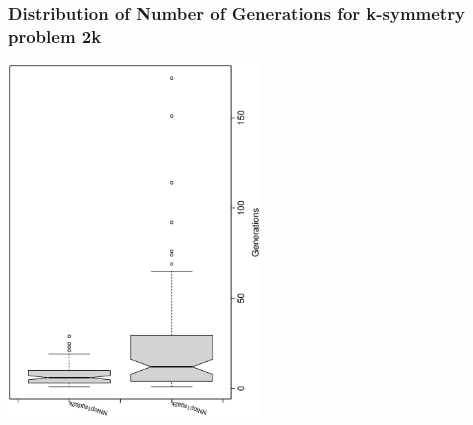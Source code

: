  \begin{frame}
 \frametitle{ Distribution of Number of Generations for k-symmetry problem 2k }
 \begin{center}
\includegraphics[width=0.5\textwidth, angle=-90]
{ExpDboxplottGenerations000.eps}
 \end{center}
 \label{ExpDboxplottGenerations000.eps}  
 \end{frame}


